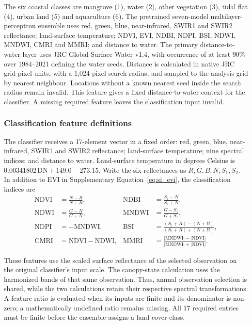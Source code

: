 The six coastal classes are mangrove (1), water (2), other vegetation (3), tidal flat (4), urban land (5) and aquaculture (6). The pretrained seven-model multilayer-perceptron ensemble uses red, green, blue, near-infrared, SWIR1 and SWIR2 reflectance; land-surface temperature; NDVI, EVI, NDBI, NDPI, BSI, NDWI, MNDWI, CMRI and MMRI; and distance to water. The primary distance-to-water layer uses JRC Global Surface Water v1.4\cite{Pekel2016}, with occurrence of at least 90\% over 1984--2021 defining the water seeds. Distance is calculated in native JRC grid-pixel units, with a 1,024-pixel search radius, and sampled to the analysis grid by nearest neighbour. Locations without a known nearest seed inside the search radius remain invalid. This feature gives a fixed distance-to-water context for the classifier. A missing required feature leaves the classification input invalid.

\begin{samepage}
\subsubsection{Classification feature definitions}
The classifier receives a 17-element vector in a fixed order: red, green, blue, near-infrared, SWIR1 and SWIR2 reflectance; land-surface temperature; nine spectral indices; and distance to water. Land-surface temperature in degrees Celsius is $0.00341802\,\mathrm{DN}+149.0-273.15$. Write the six reflectances as $R,G,B,N,S_1,S_2$. In addition to EVI in Supplementary Equation~\eqref{eq:si_evi}, the classification indices are
\begin{align*}
\mathrm{NDVI}&=\frac{N-R}{N+R}, &
\mathrm{NDBI}&=\frac{S_1-N}{S_1+N},\\
\mathrm{NDWI}&=\frac{G-N}{G+N}, &
\mathrm{MNDWI}&=\frac{G-S_1}{G+S_1},\\
\mathrm{NDPI}&=-\mathrm{MNDWI}, &
\mathrm{BSI}&=\frac{(S_1+R)-(N+B)}{(S_1+R)+(N+B)},\\
\mathrm{CMRI}&=\mathrm{NDVI}-\mathrm{NDWI}, &
\mathrm{MMRI}&=\frac{|\mathrm{MNDWI}|-|\mathrm{NDVI}|}
 {|\mathrm{MNDWI}|+|\mathrm{NDVI}|}.
\end{align*}
\end{samepage}
These features use the scaled surface reflectance of the selected observation on the original classifier's input scale. The canopy-state calculation uses the harmonized bands of that same observation. Thus, annual observation selection is shared, while the two calculations retain their respective spectral transformations. A feature ratio is evaluated when its inputs are finite and its denominator is non-zero; a mathematically undefined ratio remains missing. All 17 required entries must be finite before the ensemble assigns a land-cover class.

